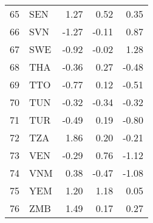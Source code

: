 \begin{table}[ht]
\begin{tabular}{rlrrr}
  65 & SEN & 1.27 & 0.52 & 0.35 \\ 
  66 & SVN & -1.27 & -0.11 & 0.87 \\ 
  67 & SWE & -0.92 & -0.02 & 1.28 \\ 
  68 & THA & -0.36 & 0.27 & -0.48 \\ 
  69 & TTO & -0.77 & 0.12 & -0.51 \\ 
  70 & TUN & -0.32 & -0.34 & -0.32 \\ 
  71 & TUR & -0.49 & 0.19 & -0.80 \\ 
  72 & TZA & 1.86 & 0.20 & -0.21 \\ 
  73 & VEN & -0.29 & 0.76 & -1.12 \\ 
  74 & VNM & 0.38 & -0.47 & -1.08 \\ 
  75 & YEM & 1.20 & 1.18 & 0.05 \\ 
  76 & ZMB & 1.49 & 0.17 & 0.27 \\ 
   \hline
\end{tabular}
\end{table}

